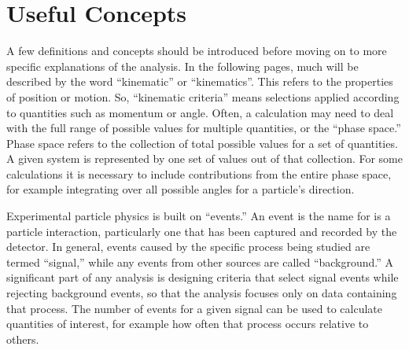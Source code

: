 \section{Useful Concepts}




A few definitions and concepts should be introduced 
before moving on to more specific explanations 
of the analysis.  
In the following pages, much will be described by the word 
``kinematic'' or ``kinematics''.  
This refers to the properties of position or motion.  
So, ``kinematic criteria'' means selections applied according to 
quantities such as momentum or angle.  
Often, a calculation may need to deal with 
the full range of possible values 
for multiple quantities, 
or the ``phase space.'' 
Phase space refers to the collection of total 
possible values for a set of quantities.  
A given system is represented by one set of 
values out of that collection.  
For some calculations it is necessary to include 
contributions from the entire phase space, 
for example integrating over all possible 
angles for a particle's direction.  

Experimental particle physics is built on ``events.''
An event is the name for is a particle interaction, 
particularly one 
that has been captured and recorded by the detector.  
In general, %
events caused by the specific process     
being studied are termed ``signal,'' 
while any events 
from other sources 
are called ``background.'' 
A significant part of any analysis is designing 
criteria that select signal events while 
rejecting background events, 
so that the analysis focuses only on data containing 
that process.  
The number of events for a given signal can be used 
to calculate quantities of interest, 
for example how often that process  
occurs relative to others.  

